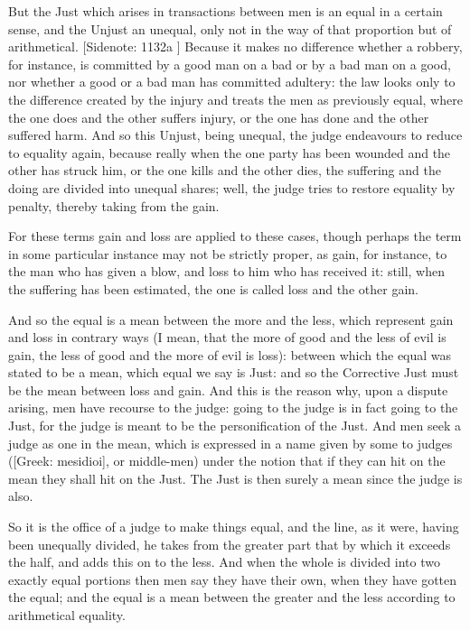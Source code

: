 But the Just which arises in transactions between men is an equal in a
certain sense, and the Unjust an unequal, only not in the way of that
proportion but of arithmetical. [Sidenote: 1132a ] Because it makes no
difference whether a robbery, for instance, is committed by a good man
on a bad or by a bad man on a good, nor whether a good or a bad man has
committed adultery: the law looks only to the difference created by the
injury and treats the men as previously equal, where the one does and
the other suffers injury, or the one has done and the other suffered
harm. And so this Unjust, being unequal, the judge endeavours to reduce
to equality again, because really when the one party has been wounded
and the other has struck him, or the one kills and the other dies, the
suffering and the doing are divided into unequal shares; well, the judge
tries to restore equality by penalty, thereby taking from the gain.

For these terms gain and loss are applied to these cases, though perhaps
the term in some particular instance may not be strictly proper, as
gain, for instance, to the man who has given a blow, and loss to him who
has received it: still, when the suffering has been estimated, the one
is called loss and the other gain.

And so the equal is a mean between the more and the less, which
represent gain and loss in contrary ways (I mean, that the more of good
and the less of evil is gain, the less of good and the more of evil is
loss): between which the equal was stated to be a mean, which equal we
say is Just: and so the Corrective Just must be the mean between loss
and gain. And this is the reason why, upon a dispute arising, men have
recourse to the judge: going to the judge is in fact going to the Just,
for the judge is meant to be the personification of the Just. And men
seek a judge as one in the mean, which is expressed in a name given by
some to judges ([Greek: mesidioi], or middle-men) under the notion that
if they can hit on the mean they shall hit on the Just. The Just is then
surely a mean since the judge is also.

So it is the office of a judge to make things equal, and the line, as it
were, having been unequally divided, he takes from the greater part that
by which it exceeds the half, and adds this on to the less. And when the
whole is divided into two exactly equal portions then men say they have
their own, when they have gotten the equal; and the equal is a mean
between the greater and the less according to arithmetical equality.

